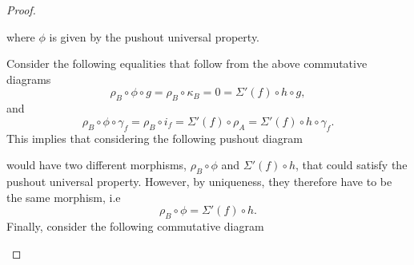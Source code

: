 \begin{proof}
\begin{enumerate}[label={(\bfseries TR\arabic*)}]
{\begin{center}
            \end{center}
            where \( \phi \) is given by the pushout universal property.

            Consider the following equalities that follow from the above commutative diagrams
            \[
                \rho_B \circ \phi \circ g = \rho_B \circ \kappa_B = 0 = \Sigma'(f) \circ h \circ g,
            \]
            and
            \[
                \rho_B \circ \phi \circ \gamma_f = \rho_B \circ i_f = \Sigma'(f) \circ \rho_A = \Sigma'(f) \circ h \circ \gamma_f.
            \]
            This implies that considering the following pushout diagram
            \begin{center}
            \end{center}
            would have two different morphisms, \( \rho_B \circ \phi \) and \( \Sigma'(f) \circ h \), that could satisfy the pushout universal property. However, by uniqueness, they therefore have to be the same morphism, i.e
            \[
                \rho_B \circ \phi = \Sigma'(f) \circ h.
            \]
            Finally, consider the following commutative diagram
            \begin{center}
\end{center}}
\end{enumerate}
\end{proof}

